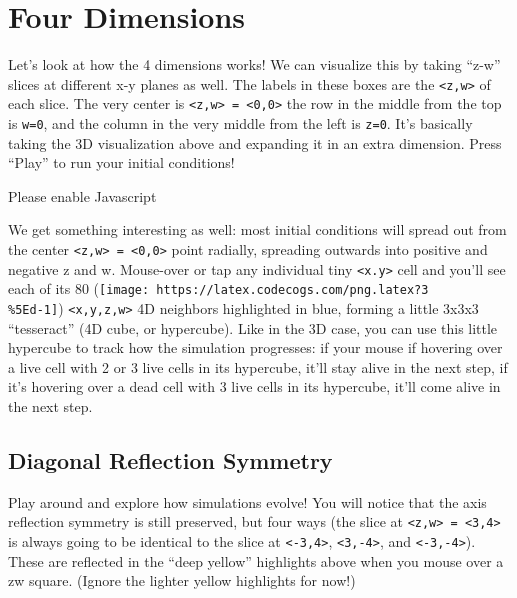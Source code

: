 \documentclass[]{article}
\begin{document}
\hypertarget{four-dimensions}{%
\section{Four Dimensions}\label{four-dimensions}}

Let's look at how the 4 dimensions works! We can visualize this by taking
``z-w'' slices at different x-y planes as well. The labels in these boxes are
the \texttt{\textless{}z,w\textgreater{}} of each slice. The very center is
\texttt{\textless{}z,w\textgreater{}\ =\ \textless{}0,0\textgreater{}} the row
in the middle from the top is \texttt{w=0}, and the column in the very middle
from the left is \texttt{z=0}. It's basically taking the 3D visualization above
and expanding it in an extra dimension. Press ``Play'' to run your initial
conditions!

\leavevmode\hypertarget{gol4D}{}%
Please enable Javascript

We get something interesting as well: most initial conditions will spread out
from the center
\texttt{\textless{}z,w\textgreater{}\ =\ \textless{}0,0\textgreater{}} point
radially, spreading outwards into positive and negative z and w. Mouse-over or
tap any individual tiny \texttt{\textless{}x.y\textgreater{}} cell and you'll
see each of its 80
(\texttt{[image: https://latex.codecogs.com/png.latex?3\\\%5Ed-1]})
\texttt{\textless{}x,y,z,w\textgreater{}} 4D neighbors highlighted in blue,
forming a little 3x3x3 ``tesseract'' (4D cube, or hypercube). Like in the 3D
case, you can use this little hypercube to track how the simulation progresses:
if your mouse if hovering over a live cell with 2 or 3 live cells in its
hypercube, it'll stay alive in the next step, if it's hovering over a dead cell
with 3 live cells in its hypercube, it'll come alive in the next step.

\hypertarget{diagonal-reflection-symmetry}{%
\subsection{Diagonal Reflection Symmetry}\label{diagonal-reflection-symmetry}}

Play around and explore how simulations evolve! You will notice that the axis
reflection symmetry is still preserved, but four ways (the slice at
\texttt{\textless{}z,w\textgreater{}\ =\ \textless{}3,4\textgreater{}} is always
going to be identical to the slice at \texttt{\textless{}-3,4\textgreater{}},
\texttt{\textless{}3,-4\textgreater{}}, and
\texttt{\textless{}-3,-4\textgreater{}}). These are reflected in the ``deep
yellow'' highlights above when you mouse over a zw square. (Ignore the lighter
yellow highlights for now!)
\end{document}
